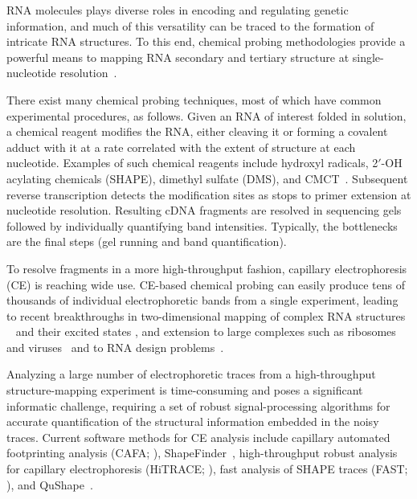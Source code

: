 
RNA molecules plays diverse roles in encoding and regulating genetic information, and much of this versatility can be traced to the formation of intricate RNA structures. To this end, chemical probing methodologies provide a powerful means to mapping RNA secondary and tertiary structure at single-nucleotide resolution~\citep{weeks2010}.

There exist many chemical probing techniques, most of which have common experimental procedures, as follows. Given an RNA of interest folded in solution, a chemical reagent modifies the RNA, either cleaving it or forming a covalent adduct with it at a rate correlated with the extent of structure at each nucleotide. Examples of such chemical reagents include hydroxyl radicals, 2$'$-OH acylating chemicals (SHAPE), dimethyl sulfate (DMS), and CMCT~\citep{Weeks2010295}. Subsequent reverse transcription detects the modification sites as stops to primer extension at nucleotide resolution. Resulting cDNA fragments are resolved in sequencing gels followed by individually quantifying band intensities. Typically, the bottlenecks are the final steps (gel running and band quantification).

To resolve fragments in a more high-throughput fashion, capillary electrophoresis (CE) is reaching wide use. CE-based chemical probing can easily produce tens of thousands of individual electrophoretic bands from a single experiment, leading to recent breakthroughs in two-dimensional mapping of complex RNA structures ~\citep{kladwangmutatemap2011} and their excited states \citep{tian2014nature}, and extension to large complexes such as ribosomes~\citep{weeksbiochemistry} and viruses~\citep{weeksplos2009,weeksnature2009} and to RNA design problems~\citep{daskaranicolasbaker2010,lee2014pnas}.

Analyzing a large number of electrophoretic traces from a high-throughput structure-mapping experiment is time-consuming and poses a significant informatic challenge, requiring a set of robust signal-processing algorithms for accurate quantification of the structural information embedded in the noisy traces. Current software methods for CE analysis include capillary automated footprinting analysis (CAFA; \citealp{mitra2008high}), ShapeFinder~\citep{vasa2008shapefinder}, high-throughput robust analysis for capillary electrophoresis (HiTRACE; \citealp{Yoon2011}), fast analysis of SHAPE traces (FAST; \citealp{Pang2011}), and QuShape~\citep{Karabiber2013}.

